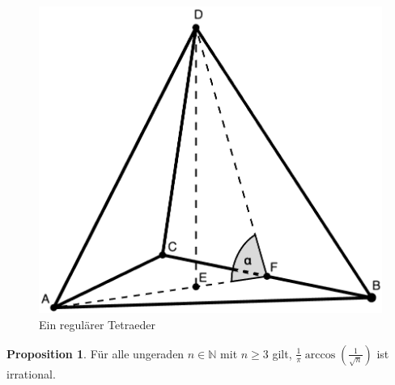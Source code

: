 \documentclass[11pt,titlepage]{article}
\newcommand{\setN}{\mathbb{N}}
\theoremstyle{definition}
\newtheorem{proposition}[theorem]{Proposition}
\theoremstyle{remark}
\begin{document}
	\begin{figure}[!htbp]
		\centering
		\includegraphics[scale=0.2]{RegulTetraeder}
		\caption{Ein regulärer Tetraeder}
		\label{Abb.4}
	\end{figure}
	
	\begin{proposition} \label{prop:irr}
		Für alle ungeraden $n\in\setN$ mit $n\geq 3$ gilt, $\frac{1}{\pi}\arccos\left(\frac{1}{\sqrt{n}}\right)$ ist irrational.
	\end{proposition}
	
\end{document}
